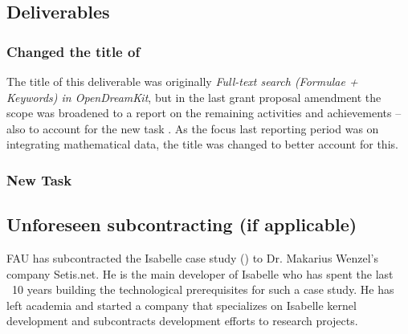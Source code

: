 \subsection{Deliverables}
\subsubsection{Changed the title of }
The title of this deliverable was originally \emph{Full-text search (Formulae + Keywords) in OpenDreamKit}, but in the last grant proposal amendment the scope was broadened to a report on the remaining  activities and achievements -- also to account for the new task . As the focus last reporting period was on integrating mathematical data, the title was changed to better account for this.


\subsubsection{New Task }

\subsection{Unforeseen subcontracting (if applicable)}
FAU has subcontracted the Isabelle case study () to Dr. Makarius Wenzel's company Setis.net.  He is the main developer of Isabelle who has spent the last ~10 years building the technological prerequisites for such a case study.  He has left academia and started a company that specializes on Isabelle kernel development and subcontracts development efforts to research projects.



